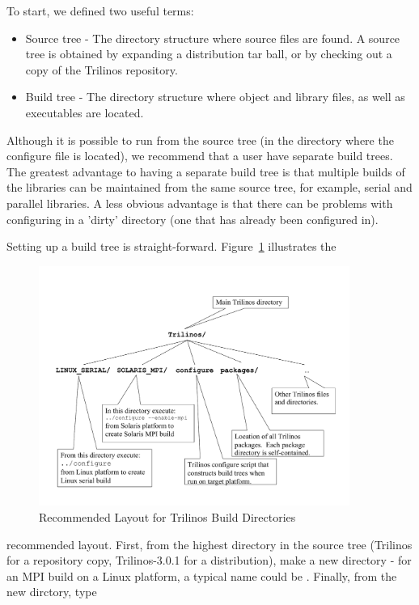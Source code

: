 \documentclass[12pt,relax]{TrilinosDevGuide}
\begin{document}
To start, we defined two useful terms:
\begin{itemize}
\item Source tree - The directory structure where source files are found.  A source 
tree is obtained by expanding a distribution tar ball, or by checking 
out a copy of the Trilinos repository.  
\item Build tree - The directory structure where object and library files, as well 
as executables are located.  
\end{itemize}
 
Although it is possible to run  from the source tree (in 
the directory where the configure file is located), we recommend that a 
user have separate build trees.  The greatest advantage to having a separate 
build tree is that multiple builds of the libraries can be maintained
from the same source tree, for 
example, serial and parallel libraries.  A less obvious advantage is that 
there can be problems with configuring in a 'dirty' directory (one that has 
already been configured in).

	Setting up a build tree is straight-forward.
Figure~\ref{Figure:TrilinosDirectoryStructure} illustrates the
\begin{figure}
\begin{center}
\includegraphics[width=4in,angle=270]{TrilinosDirectoryStructure}
\end{center}
\label{Figure:TrilinosDirectoryStructure}
\caption{Recommended Layout for Trilinos Build Directories}
\end{figure}recommended layout.  First, from the highest 
directory in the source tree (Trilinos for a repository copy, Trilinos-3.0.1 
for a distribution), make a new directory - for an MPI build
on a Linux platform, a 
typical name could be .  
Finally, from the new dirctory, type
\end{document}
